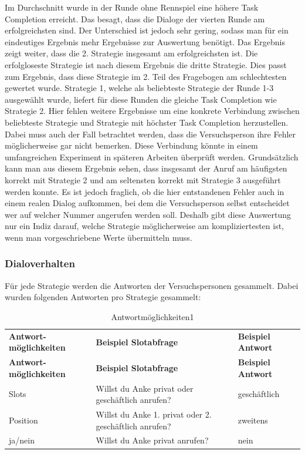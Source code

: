 \documentclass[12pt,a4paper]{scrartcl}
\begin{document}
Im Durchschnitt wurde in der Runde ohne Rennspiel eine höhere Task Completion erreicht. Das besagt, dass die Dialoge der vierten Runde am erfolgreichsten sind. Der Unterschied ist jedoch sehr gering, sodass man für ein eindeutiges Ergebnis mehr Ergebnisse zur Auswertung benötigt. Das Ergebnis zeigt weiter, dass die 2. Strategie insgesamt am erfolgreichsten ist. Die erfolgloseste Strategie ist nach diesem Ergebnis die dritte Strategie. Dies passt zum Ergebnis, dass diese Strategie im 2. Teil des Fragebogen am schlechtesten gewertet wurde. Strategie 1, welche als beliebteste Strategie der Runde 1-3 ausgewählt wurde, liefert für diese Runden die gleiche Task Completion wie Strategie 2. Hier fehlen weitere Ergebnisse um eine konkrete Verbindung zwischen beliebteste Strategie und Strategie mit höchster Task Completion herzustellen. Dabei muss auch der Fall betrachtet werden, dass die Versuchsperson ihre Fehler möglicherweise gar nicht bemerken. Diese Verbindung könnte in einem umfangreichen Experiment in späteren Arbeiten überprüft werden. 
Grundsätzlich kann man aus diesem Ergebnis sehen, dass insgesamt der Anruf am häufigsten korrekt mit Strategie 2 und am seltensten korrekt mit Strategie 3 ausgeführt werden konnte. \newline
Es ist jedoch fraglich, ob die hier entstandenen Fehler auch in einem realen Dialog aufkommen, bei dem die Versuchsperson selbst entscheidet wer auf welcher Nummer angerufen werden soll. Deshalb gibt diese Auswertung nur ein Indiz darauf, welche Strategie möglicherweise am kompliziertesten ist, wenn man vorgeschriebene Werte übermitteln muss. 


\subsubsection{Dialoverhalten}
Für jede Strategie werden die Antworten der Versuchspersonen gesammelt. Dabei wurden folgenden Antworten pro Strategie gesammelt:
\begin{longtable}{p{4cm}p{4cm}p{4cm}}
	\label{Dialogverhalten11}\\
	\caption[Antwortmöglichkeiten1]{Antwortmöglichkeiten1}\\
	\hline
\textbf{Antwort-möglichkeiten}&\textbf{Beispiel \newline Slotabfrage}&\textbf{Beispiel \newline Antwort}\\
	\hline
	\endfirsthead
	\hline
	\textbf{Antwort-möglichkeiten}&\textbf{Beispiel \newline Slotabfrage}&\textbf{Beispiel \newline Antwort}\\
	\hline
	\endhead
Slots  & Willst du Anke privat oder geschäftlich anrufen? & geschäftlich  \\
Position & Willst du Anke 1. privat oder 2. geschäftlich anrufen? & zweitens  \\
ja/nein & Willst du Anke privat anrufen? &  nein\\ 
\hline
\end{longtable}
\end{document}
